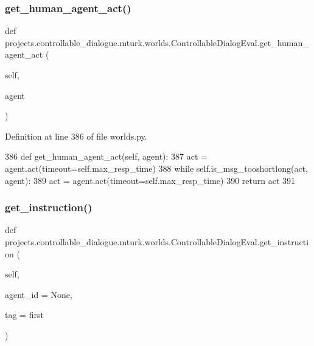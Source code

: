 \subsubsection{\texorpdfstring{get\+\_\+human\+\_\+agent\+\_\+act()}{get\_human\_agent\_act()}}
{\footnotesize\ttfamily def projects.\+controllable\+\_\+dialogue.\+mturk.\+worlds.\+Controllable\+Dialog\+Eval.\+get\+\_\+human\+\_\+agent\+\_\+act (\begin{DoxyParamCaption}\item[{}]{self,  }\item[{}]{agent }\end{DoxyParamCaption})}



Definition at line 386 of file worlds.\+py.


\begin{DoxyCode}
386     \textcolor{keyword}{def }get\_human\_agent\_act(self, agent):
387         act = agent.act(timeout=self.max\_resp\_time)
388         \textcolor{keywordflow}{while} self.is\_msg\_tooshortlong(act, agent):
389             act = agent.act(timeout=self.max\_resp\_time)
390         \textcolor{keywordflow}{return} act
391 
\end{DoxyCode}
\mbox{\label{classprojects_1_1controllable__dialogue_1_1mturk_1_1worlds_1_1ControllableDialogEval_a787f3ae4c9c8e8ec24139a9fa39792b2}} 
\subsubsection{\texorpdfstring{get\+\_\+instruction()}{get\_instruction()}}
{\footnotesize\ttfamily def projects.\+controllable\+\_\+dialogue.\+mturk.\+worlds.\+Controllable\+Dialog\+Eval.\+get\+\_\+instruction (\begin{DoxyParamCaption}\item[{}]{self,  }\item[{}]{agent\+\_\+id = {\ttfamily None},  }\item[{}]{tag = {\ttfamily \textquotesingle{}first\textquotesingle{}} }\end{DoxyParamCaption})}



